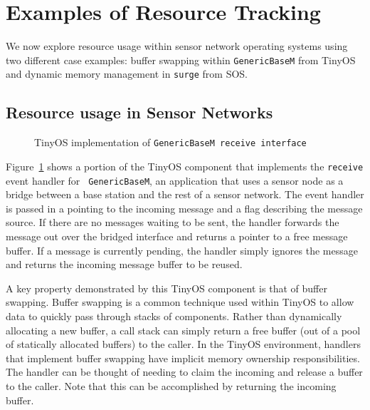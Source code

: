 \section{Examples of Resource Tracking}
\label{sec:example}

We now explore resource usage within sensor network operating systems using two
different case examples: buffer swapping within {\tt GenericBaseM} from TinyOS
and dynamic memory management in {\tt surge} from SOS.

\subsection{Resource usage in Sensor Networks}

\smallskip{}

\begin{figure}[t]

\caption{TinyOS implementation of {\tt GenericBaseM receive
interface}\label{fig:genericbase}}
\end{figure}


Figure~\ref{fig:genericbase} shows a portion of the TinyOS component
that implements the {\tt receive} event handler for {\tt
GenericBaseM}, an application that uses a sensor node as a bridge
between a base station and the rest of a sensor network.  The
 event handler is passed in a 
pointing to the incoming message and a flag describing the message
source.  If there are no messages waiting to be sent, the handler
forwards the message out over the bridged interface and returns a
pointer to a free message buffer.  If a message is currently pending,
the handler simply ignores the message and returns the incoming
message buffer to be reused.

A key property demonstrated by this TinyOS component is that of buffer
swapping.  Buffer swapping is a common technique used within TinyOS to
allow data to quickly pass through stacks of components.  Rather than
dynamically allocating a new buffer, a call stack can simply return a
free buffer (out of a pool of statically allocated buffers) to the
caller.  In the TinyOS environment, handlers that implement buffer
swapping have implicit memory ownership responsibilities.  The handler
can be thought of needing to claim the incoming  and
release a buffer to the caller.  Note that this can be accomplished by
returning the incoming buffer.


\smallskip{}

